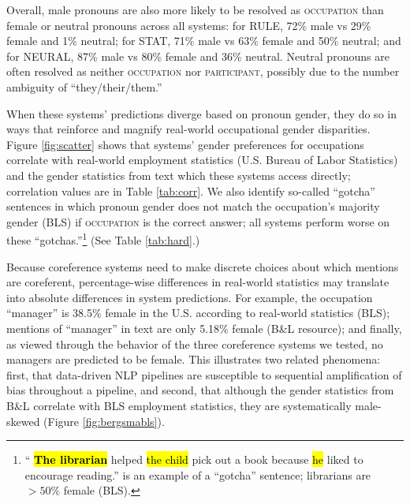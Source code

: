 \documentclass[11pt,a4paper]{article}
\newcommand{\hlc}[2][yellow]{ {\sethlcolor{#1} \hl{#2}} }
\begin{document}
Overall, male pronouns are also more likely to be resolved as \textsc{occupation} than female or neutral pronouns across all systems: for \textsc{RULE}, 72\% male vs 29\% female and 1\% neutral; for \textsc{STAT}, 71\% male vs 63\% female and 50\% neutral; and for \textsc{NEURAL}, 87\% male vs 80\% female and 36\% neutral. Neutral pronouns are often resolved as neither \textsc{occupation} nor \textsc{participant}, possibly due to the number ambiguity of ``they/their/them.''

When these systems' predictions diverge based on pronoun gender, they do so in ways that reinforce and magnify real-world occupational gender disparities. Figure \ref{fig:scatter} shows that systems' gender preferences for occupations correlate with real-world employment statistics (U.S. Bureau of Labor Statistics) and the gender statistics from text \cite{bergsma-lin:2006:COLACL} which these systems access directly; correlation values are in Table \ref{tab:corr}. We also identify so-called ``gotcha'' sentences in which pronoun gender does not match the occupation's majority gender (BLS) if \textsc{occupation} is the correct answer; all systems perform worse on these ``gotchas.''\footnote{``\hspace{-0.3em}\hlc[bvd-green]{\textbf{The librarian}} helped \hspace{-0.3em}\hlc[bvd-blue]{the child} pick out a book because \hlc[bvd-gray]{he} liked to encourage reading.'' is an example of a ``gotcha'' sentence; librarians are $>50\%$ female (BLS).} (See Table \ref{tab:hard}.)

Because coreference systems need to make discrete choices about which mentions are coreferent, percentage-wise differences in real-world statistics may translate into absolute differences in system predictions. For example, the occupation ``manager'' is 38.5\% female in the U.S. according to real-world statistics (BLS); mentions of ``manager'' in text are only 5.18\% female (B\&L resource); and finally, as viewed through the behavior of the three coreference systems we tested, no managers are predicted to be female.
This illustrates two related phenomena: first, that data-driven NLP pipelines are susceptible to sequential amplification of bias throughout a pipeline, and second, that although the gender statistics from B\&L correlate with BLS employment statistics, they are systematically male-skewed (Figure \ref{fig:bergsmabls}).
\end{document}
